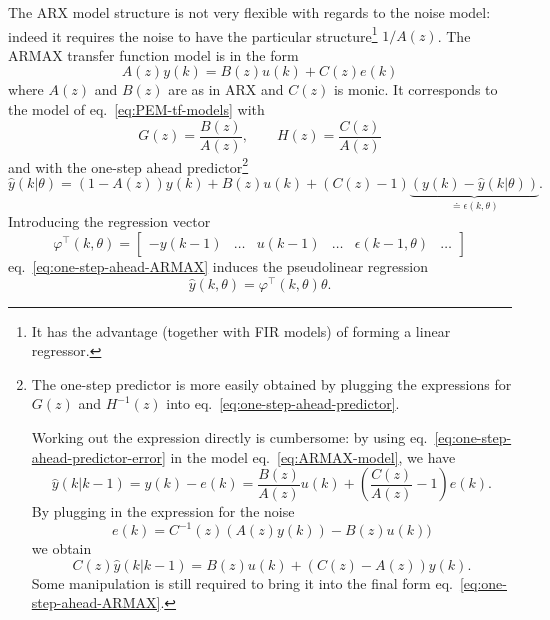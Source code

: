 The ARX model structure is not very flexible with regards to the noise model: indeed it requires the noise to have the particular structure\footnote{It has the advantage (together with FIR models) of forming a linear regressor.} $1/A(z)$. The ARMAX transfer function model is in the form
\begin{equation}
  \label{eq:ARMAX-model}
  A(z)y(k) = B(z)u(k) + C(z)e(k)
\end{equation}
where $A(z)$ and $B(z)$ are as in ARX and $C(z)$ is monic. It corresponds to the model of eq.~\eqref{eq:PEM-tf-models} with
\begin{equation*}
  G(z) = \frac{B(z)}{A(z)},\hspace{2em} H(z) = \frac{C(z)}{A(z)}
\end{equation*}
and with the one-step ahead predictor\footnote{The one-step predictor is more easily obtained by plugging the expressions for $G(z)$ and $H^{-1}(z)$ into eq.~\eqref{eq:one-step-ahead-predictor}.

  Working out the expression directly is cumbersome: by using eq.~\eqref{eq:one-step-ahead-predictor-error} in the model eq.~\eqref{eq:ARMAX-model}, we have
  \begin{equation*}
    \hat{y}(k|k-1) = y(k) - e(k) = \frac{B(z)}{A(z)}u(k) + \left(\frac{C(z)}{A(z)}-1\right)e(k).
  \end{equation*}
  By plugging in the expression for the noise
  \begin{equation*}
    e(k) = C^{-1}(z)(A(z)y(k)) - B(z)u(k))
  \end{equation*}
  we obtain
  \begin{equation*}
    C(z)\hat{y}(k|k-1) = B(z)u(k) + (C(z)-A(z))y(k).
  \end{equation*}
  Some manipulation is still required to bring it into the final form eq.~\eqref{eq:one-step-ahead-ARMAX}.}
\begin{equation}
  \label{eq:one-step-ahead-ARMAX}
  \hat{y}(k|\theta) = (1-A(z))y(k) + B(z)u(k) + (C(z)-1)\underbrace{(y(k)-\hat{y}(k|\theta))}_{\doteq \epsilon(k,\theta)}.
\end{equation}
Introducing the regression vector
\begin{equation*}
  \varphi^\top(k,\theta) =
  \begin{bmatrix}
    -y(k-1) & \ldots & u(k-1) & \ldots & \epsilon(k-1,\theta) & \ldots
  \end{bmatrix}
\end{equation*}
eq.~\eqref{eq:one-step-ahead-ARMAX} induces the pseudolinear regression
\begin{equation*}
  \hat{y}(k,\theta) = \varphi^\top(k,\theta) \theta.
\end{equation*}

